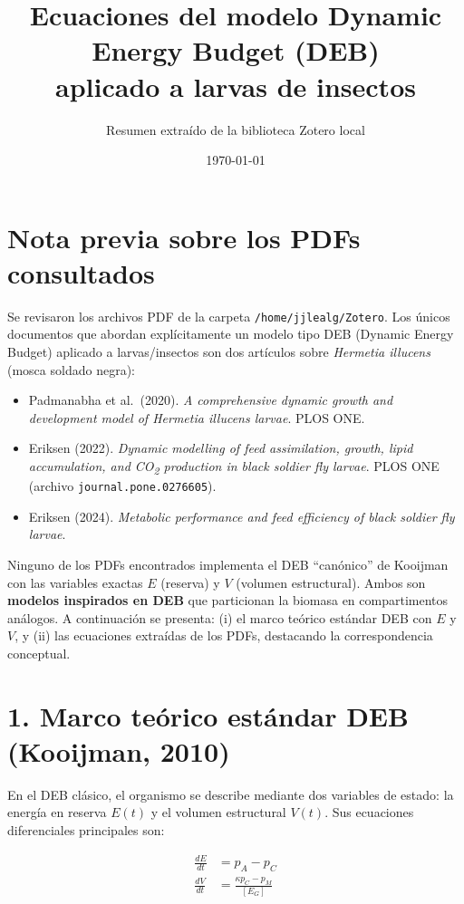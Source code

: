 \documentclass[11pt,a4paper]{article}
\title{Ecuaciones del modelo Dynamic Energy Budget (DEB) \\ aplicado a larvas de insectos}
\author{Resumen extraído de la biblioteca Zotero local}
\date{\today}
\begin{document}
\maketitle

\section*{Nota previa sobre los PDFs consultados}

Se revisaron los archivos PDF de la carpeta \texttt{/home/jjlealg/Zotero}. Los únicos documentos que abordan explícitamente un modelo tipo DEB (Dynamic Energy Budget) aplicado a larvas/insectos son dos artículos sobre \textit{Hermetia illucens} (mosca soldado negra):

\begin{itemize}
    \item Padmanabha et al.\ (2020). \textit{A comprehensive dynamic growth and development model of Hermetia illucens larvae}. PLOS ONE.
    \item Eriksen (2022). \textit{Dynamic modelling of feed assimilation, growth, lipid accumulation, and CO\textsubscript{2} production in black soldier fly larvae}. PLOS ONE (archivo \texttt{journal.pone.0276605}).
    \item Eriksen (2024). \textit{Metabolic performance and feed efficiency of black soldier fly larvae}.
\end{itemize}

Ninguno de los PDFs encontrados implementa el DEB ``canónico'' de Kooijman con las variables exactas $E$ (reserva) y $V$ (volumen estructural). Ambos son \textbf{modelos inspirados en DEB} que particionan la biomasa en compartimentos análogos. A continuación se presenta: (i) el marco teórico estándar DEB con $E$ y $V$, y (ii) las ecuaciones extraídas de los PDFs, destacando la correspondencia conceptual.

\section{1. Marco teórico estándar DEB (Kooijman, 2010)}

En el DEB clásico, el organismo se describe mediante dos variables de estado: la energía en reserva $E(t)$ y el volumen estructural $V(t)$. Sus ecuaciones diferenciales principales son:

\begin{align}
    \frac{dE}{dt} &= p_A - p_C \label{eq:deb_E} \\[6pt]
    \frac{dV}{dt} &= \frac{\kappa p_C - p_M}{[E_G]} \label{eq:deb_V}
\end{align}
\end{document}
